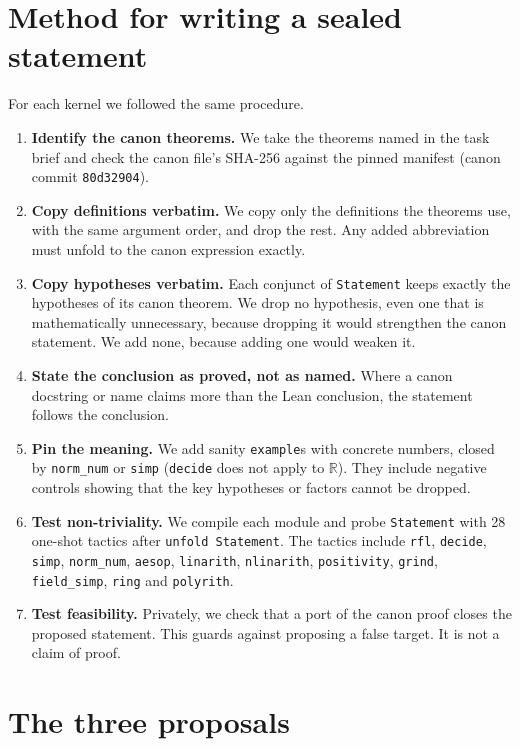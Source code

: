 \documentclass[11pt]{article}
\theoremstyle{definition}
\theoremstyle{remark}
\begin{document}
\section{Method for writing a sealed statement}
For each kernel we followed the same procedure.
\begin{enumerate}
\item \textbf{Identify the canon theorems.} We take the theorems named in the task brief and check the canon file's SHA-256
against the pinned manifest (canon commit \texttt{80d32904}).
\item \textbf{Copy definitions verbatim.} We copy only the definitions the theorems use, with the same argument order,
and drop the rest. Any added abbreviation must unfold to the canon expression exactly.
\item \textbf{Copy hypotheses verbatim.} Each conjunct of \texttt{Statement} keeps exactly the hypotheses of its canon theorem.
We drop no hypothesis, even one that is mathematically unnecessary, because dropping it would strengthen the canon statement.
We add none, because adding one would weaken it.
\item \textbf{State the conclusion as proved, not as named.} Where a canon docstring or name claims more than the Lean
conclusion, the statement follows the conclusion.
\item \textbf{Pin the meaning.} We add sanity \texttt{example}s with concrete numbers, closed by \texttt{norm\_num} or \texttt{simp}
(\texttt{decide} does not apply to $\mathbb{R}$). They include negative controls showing that the key hypotheses or factors cannot be dropped.
\item \textbf{Test non-triviality.} We compile each module and probe \texttt{Statement} with 28 one-shot tactics
after \texttt{unfold Statement}. The tactics include \texttt{rfl}, \texttt{decide}, \texttt{simp}, \texttt{norm\_num}, \texttt{aesop},
\texttt{linarith}, \texttt{nlinarith}, \texttt{positivity}, \texttt{grind}, \texttt{field\_simp}, \texttt{ring} and \texttt{polyrith}.
\item \textbf{Test feasibility.} Privately, we check that a port of the canon proof closes the proposed statement.
This guards against proposing a false target. It is not a claim of proof.
\end{enumerate}

\section{The three proposals}
\end{document}
